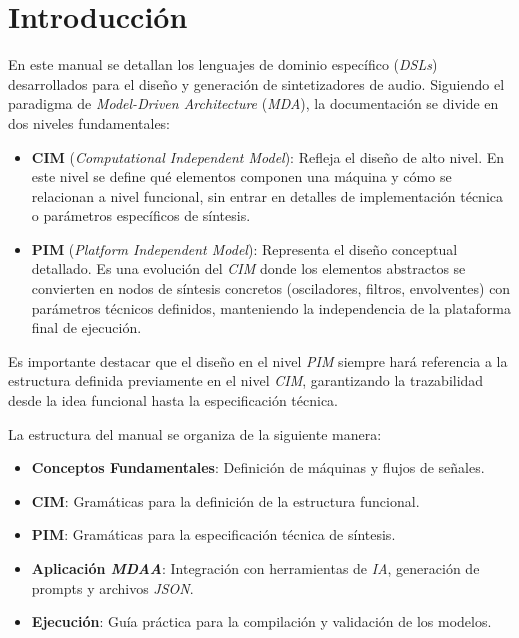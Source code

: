 \chapter{Introducción}

En este manual se detallan los lenguajes de dominio específico (\textit{DSLs}) desarrollados para el diseño y generación de sintetizadores de audio. Siguiendo el paradigma de \textit{Model-Driven Architecture} (\textit{MDA}), la documentación se divide en dos niveles fundamentales:

\begin{itemize}
    \item \textbf{CIM} (\textit{Computational Independent Model}): Refleja el diseño de alto nivel. En este nivel se define qué elementos componen una máquina y cómo se relacionan a nivel funcional, sin entrar en detalles de implementación técnica o parámetros específicos de síntesis.
    \item \textbf{PIM} (\textit{Platform Independent Model}): Representa el diseño conceptual detallado. Es una evolución del \textit{CIM} donde los elementos abstractos se convierten en nodos de síntesis concretos (osciladores, filtros, envolventes) con parámetros técnicos definidos, manteniendo la independencia de la plataforma final de ejecución.
\end{itemize}

Es importante destacar que el diseño en el nivel \textit{PIM} siempre hará referencia a la estructura definida previamente en el nivel \textit{CIM}, garantizando la trazabilidad desde la idea funcional hasta la especificación técnica.

La estructura del manual se organiza de la siguiente manera:

\begin{itemize}
    \item \textbf{Conceptos Fundamentales}: Definición de máquinas y flujos de señales.
    \item \textbf{CIM}: Gramáticas para la definición de la estructura funcional.
    \item \textbf{PIM}: Gramáticas para la especificación técnica de síntesis.
    \item \textbf{Aplicación \textit{MDAA}}: Integración con herramientas de \textit{IA}, generación de prompts y archivos \textit{JSON}.
    \item \textbf{Ejecución}: Guía práctica para la compilación y validación de los modelos.
\end{itemize}


